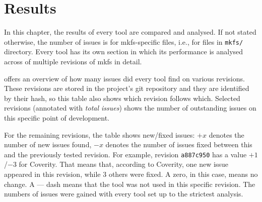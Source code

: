 
\chapter{Results}\label{chap:results}

In this chapter, the results of every tool are compared and analysed. If not
stated otherwise, the number of issues is for mkfs-specific files, i.e., for
files in {\tt mkfs/} directory. Every tool has its own section in which its
performance is analysed across of multiple revisions of mkfs in detail.

 offers an overview of how many issues did every
tool find on various revisions. These revisions are stored in the project's git
repository and they are identified by their hash, so this table also shows
which revision follows which.  Selected revisions (annotated with {\em total
issues}) shows the number of outstanding issues on this specific point of
development.

For the remaining revisions, the table shows new/fixed issues: $+x$ denotes the
number of new issues found, $-x$ denotes the number of issues fixed between this
and the previously tested revision. For example, revision {\tt a887c950} has a
value $+1$/$-3$ for Coverity. That means that, according to Coverity, one new
issue appeared in this revision, while 3 others were fixed. A zero, in this
case, means no change.  A --- dash means that the tool was not used in this
specific revision.  The numbers of issues were gained with every tool set up to
the strictest analysis.

